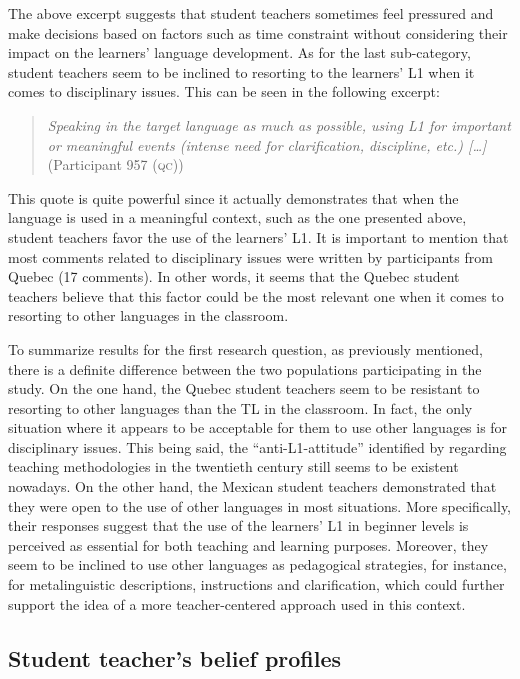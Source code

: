 \documentclass[output=paper]{../langscibook}
\begin{document}
The above excerpt suggests that student teachers sometimes feel pressured and make decisions based on factors such as time constraint without considering their impact on the learners’ language development. As for the last sub-category, student teachers seem to be inclined to resorting to the learners’ L1 when it comes to disciplinary issues. This can be seen in the following excerpt:

\begin{quote}
\emph{Speaking in the target language as much as possible, using L1 for important or meaningful events (intense need for clarification, discipline, etc.) […]} (Participant 957 (\textsc{qc}))
\end{quote}

This quote is quite powerful since it actually demonstrates that when the language is used in a meaningful context, such as the one presented above, student teachers favor the use of the learners’ L1. It is important to mention that most comments related to disciplinary issues were written by participants from Quebec (17 comments). In other words, it seems that the Quebec student teachers believe that this factor could be the most relevant one when it comes to resorting to other languages in the classroom.

To summarize results for the first research question, as previously mentioned, there is a definite difference between the two populations participating in the study. On the one hand, the Quebec student teachers seem to be resistant to resorting to other languages than the TL in the classroom. In fact, the only situation where it appears to be acceptable for them to use other languages is for disciplinary issues. This being said, the “anti-L1-attitude” identified by \citet{Cook2001} regarding teaching methodologies in the twentieth century still seems to be existent nowadays. On the other hand, the Mexican student teachers demonstrated that they were open to the use of other languages in most situations. More specifically, their responses suggest that the use of the learners’ L1 in beginner levels is perceived as essential for both teaching and learning purposes. Moreover, they seem to be inclined to use other languages as pedagogical strategies, for instance, for metalinguistic descriptions, instructions and clarification, which could further support the idea of a more teacher-centered approach used in this context.



\subsection{Student teacher’s belief profiles}
\largerpage
\end{document}
